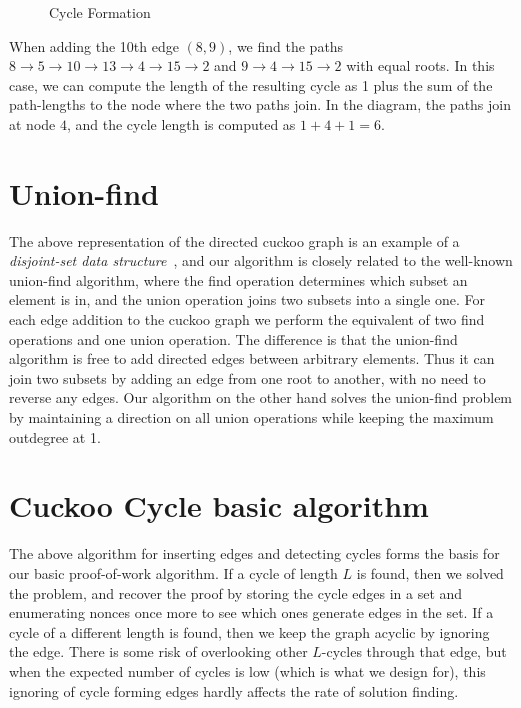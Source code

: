 \documentclass[11pt, oneside]{article}
\begin{document}
\begin{figure}
\begin{center}
\end{center}
\caption{Cycle Formation}
\label{cycleformation}
\end{figure}
When adding the 10th edge $(8,9)$, we find the paths $8 \rightarrow 5
\rightarrow 10 \rightarrow 13 \rightarrow 4 \rightarrow 15 \rightarrow 2$ and
$9 \rightarrow 4 \rightarrow 15 \rightarrow 2$ with equal roots.
In this case, we can compute the length of the resulting cycle as
1 plus the sum of the path-lengths to the node where the two paths join.
In the diagram, the paths join at node $4$, and the cycle length is computed as $1+4+1=6$.

\section{Union-find}
The above representation of the directed cuckoo graph is an example of
a {\em disjoint-set data structure}~\cite{wikidsds2014}, and our algorithm is
closely related to the well-known union-find algorithm, where the find operation
determines which subset an element is in, and the union operation joins two subsets
into a single one. For each edge addition to the cuckoo graph we perform the equivalent
of two find operations and one union operation.
The difference is that the union-find algorithm is free to add
directed edges between arbitrary elements. Thus it can join two subsets by adding an edge
from one root to another, with no need to reverse any edges.
Our algorithm on the other hand solves the union-find problem by maintaining
a direction on all union operations while keeping the maximum outdegree at 1.

\section{Cuckoo Cycle basic algorithm}
The above algorithm for inserting edges and detecting cycles forms the basis
for our basic proof-of-work algorithm.
If a cycle of length $L$ is found, then we solved the problem, and recover the proof
by storing the cycle edges in a set and enumerating nonces once more to see which ones
generate edges in the set.
If a cycle of a different length is found, then we keep the graph acyclic by ignoring the edge.
There is some risk of overlooking other $L$-cycles
through that edge, but when the expected number of cycles is low (which is what we design for),
this ignoring of cycle forming edges hardly affects the rate of solution finding.
\end{document}
